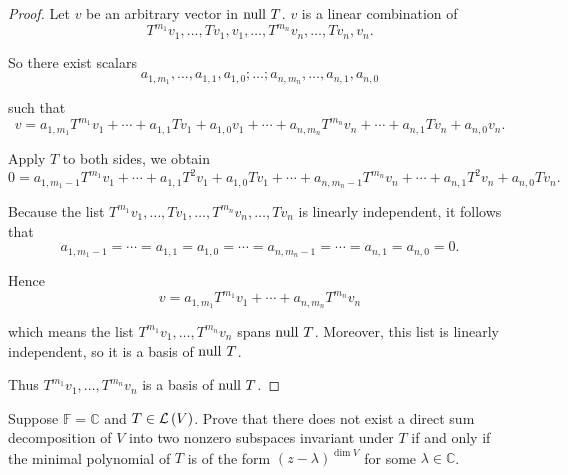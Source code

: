 \begin{proof}
    Let $v$ be an arbitrary vector in $\operatorname{null}\,{T}$. $v$ is a linear combination of
    \[
        T^{m_{1}}v_{1}, \ldots, Tv_{1}, v_{1}, \ldots, T^{m_{n}}v_{n}, \ldots, Tv_{n}, v_{n}.
    \]

    So there exist scalars
    \[
        a_{1,m_{1}}, \ldots, a_{1,1}, a_{1,0}; \ldots; a_{n,m_{n}}, \ldots, a_{n,1}, a_{n,0}
    \]

    such that
    \[
        v = a_{1,m_{1}}T^{m_{1}}v_{1} + \cdots + a_{1,1}Tv_{1} + a_{1,0}v_{1} + \cdots + a_{n,m_{n}}T^{m_{n}}v_{n} + \cdots + a_{n,1}Tv_{n} + a_{n,0}v_{n}.
    \]

    Apply $T$ to both sides, we obtain
    \[
        0 = a_{1,m_{1}-1}T^{m_{1}}v_{1} + \cdots + a_{1,1}T^{2}v_{1} + a_{1,0}Tv_{1} + \cdots + a_{n,m_{n}-1}T^{m_{n}}v_{n} + \cdots + a_{n,1}T^{2}v_{n} + a_{n,0}Tv_{n}.
    \]

    Because the list $T^{m_{1}}v_{1}, \ldots, Tv_{1}, \ldots, T^{m_{n}}v_{n}, \ldots, Tv_{n}$ is linearly independent, it follows that
    \[
        a_{1,m_{1}-1} = \cdots = a_{1,1} = a_{1,0} = \cdots = a_{n,m_{n}-1} = \cdots = a_{n,1} = a_{n,0} = 0.
    \]

    Hence
    \[
        v = a_{1,m_{1}}T^{m_{1}}v_{1} + \cdots + a_{n,m_{n}}T^{m_{n}}v_{n}
    \]

    which means the list $T^{m_{1}}v_{1}, \ldots, T^{m_{n}}v_{n}$ spans $\operatorname{null}\,{T}$. Moreover, this list is linearly independent, so it is a basis of $\operatorname{null}\,{T}$.

    Thus $T^{m_{1}}v_{1}, \ldots, T^{m_{n}}v_{n}$ is a basis of $\operatorname{null}\,{T}$.
\end{proof}
\newpage

\begin{exercise}\label{chapter8:sectionC:exercise14}
    Suppose $\mathbb{F} = \mathbb{C}$ and $T \in \mathcal{L}\left({V}\right)$. Prove that there does not exist a direct sum decomposition of $V$ into two nonzero subspaces invariant under $T$ if and only if the minimal polynomial of $T$ is of the form ${(z - \lambda)}^{\dim V}$ for some $\lambda\in\mathbb{C}$.
\end{exercise}

